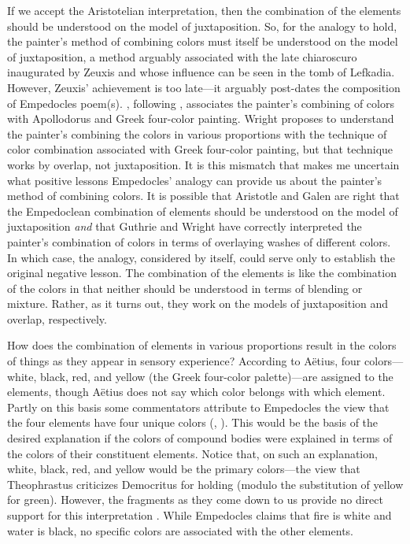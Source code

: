 If we accept the Aristotelian interpretation, then the combination of the elements should be understood on the model of juxtaposition. So, for the analogy to hold, the painter's method of combining colors must itself be understood on the model of juxtaposition, a method arguably associated with the late chiaroscuro inaugurated by Zeuxis and whose influence can be seen in the tomb of Lefkadia. However, Zeuxis' achievement is too late---it arguably post-dates the composition of Empedocles poem(s).  \citet[38--39]{Wright:1981zr}, following \citet[148]{Guthrie:1965ys}, associates the painter's combining of colors with Apollodorus and Greek four-color painting. Wright proposes to understand the painter's combining the colors in various proportions with the technique of color combination associated with Greek four-color painting, but that technique works by overlap, not juxtaposition. It is this mismatch that makes me uncertain what positive lessons Empedocles' analogy can provide us about the painter's method of combining colors. It is possible that Aristotle and Galen are right that the Empedoclean combination of elements should be understood on the model of juxtaposition \emph{and} that Guthrie and Wright have correctly interpreted the painter's combination of colors in terms of overlaying washes of different colors. In which case, the analogy, considered by itself, could serve only to establish the original negative lesson. The combination of the elements is like the combination of the colors in that neither should be understood in terms of blending or mixture. Rather, as it turns out, they work on the models of juxtaposition and overlap, respectively.

How does the combination of elements in various proportions result in the colors of things as they appear in sensory experience? According to Aëtius, four colors---white, black, red, and yellow (the Greek four-color palette)---are assigned to the elements, though Aëtius does not say which color belongs with which element. Partly on this basis some commentators attribute to Empedocles the view that the four elements have four unique colors (\citealt[217]{Cherniss:1935fk}, \citealt[152-3]{Siegel:1959fk}). This would be the basis of the desired explanation if the colors of compound bodies were explained in terms of the colors of their constituent elements. Notice that, on such an explanation, white, black, red, and yellow would be the primary colors---the view that Theophrastus criticizes Democritus for holding (modulo the substitution of yellow for green).  However, the fragments as they come down to us provide no direct support for this interpretation \citep[see][]{Ierodiakonou:2005fk}. While Empedocles claims that fire is white and water is black, no specific colors are associated with the other elements. 

